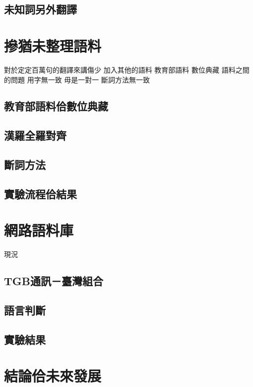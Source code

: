 \documentclass[final,oneside,onecolumn,12pt,a4paper]{book}%
\begin{document}
\section{未知詞另外翻譯}
\label{節：未知詞另外翻譯}

\chapter{摻猶未整理語料}
\label{章：摻猶未整理語料}
對於定定百萬句的翻譯來講傷少
加入其他的語料
教育部語料
數位典藏
 語料之間的問題
用字無一致
毋是一對一
斷詞方法無一致

\section{教育部語料佮數位典藏}
\label{節：教育部語料佮數位典藏}

\section{漢羅全羅對齊}
\label{節：漢羅全羅對齊}

\section{斷詞方法}
\label{節：斷詞方法}

\section{實驗流程佮結果}
\label{節：實驗流程佮結果}


\chapter{網路語料庫}
\label{章：網路語料庫}
現況
\section{TGB通訊－臺灣組合}
\label{節：TGB通訊－臺灣組合}

\section{語言判斷}
\label{節：語言判斷}

\section{實驗結果}
\label{節：實驗結果}


\chapter{結論佮未來發展}
\label{章：結論佮未來發展}
\end{document}
